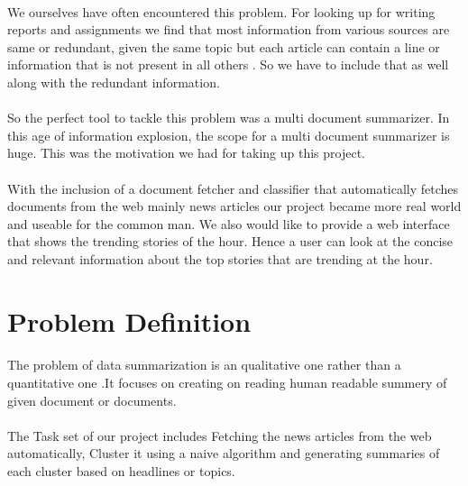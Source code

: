 \paragraph{} We ourselves have often encountered this problem. For looking up for writing reports and assignments we find that most information from various sources are same or redundant, given the same topic but each article can contain a line or information that is not present in all others . So we have to include that as well along with the redundant information.
\paragraph{} So the perfect tool to tackle this problem was a multi document summarizer. In this age of information explosion, the scope for a multi document summarizer is huge. This was the motivation we had for taking up this project. 
\paragraph{} With the inclusion of a document fetcher and classifier that automatically fetches documents from the web mainly news articles our project became more real world and useable for the common man. We also would like to provide a web interface that shows the trending stories of the hour. Hence a user can look at the concise and relevant information about the top stories that are trending at the hour.

\section{Problem Definition}
\paragraph{} The problem of data summarization is an qualitative one rather than a quantitative one .It focuses on creating on reading human readable summery of given document or documents.
\paragraph{} The Task set of our project includes Fetching the news articles from the web automatically, Cluster it using a naive algorithm and generating summaries of each cluster based on headlines or topics.
